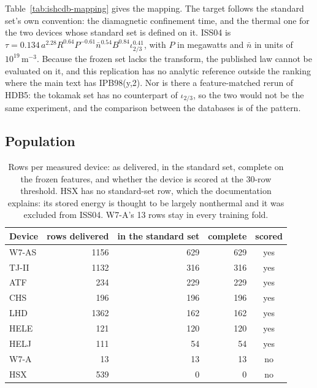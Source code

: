\documentclass[12pt,letterpaper]{article}
\newcommand{\iotatwothirds}{\iota_{2/3}}
\begin{document}
Table~\ref{tab:ishcdb-mapping} gives the mapping. The target follows the standard set's own convention: the diamagnetic
confinement time, and the thermal one for the two devices whose standard set is
defined on it. ISS04 is
$\tau = 0.134\, a^{2.28} R^{0.64}
P^{-0.61} \bar{n}^{0.54}
B^{0.84} \iotatwothirds^{0.41}$,
with $P$ in megawatts and $\bar{n}$ in units of $10^{19}\,\mathrm{m}^{-3}$.
Because the frozen set lacks the transform, the published law cannot be
evaluated on it, and this replication has no analytic reference outside the
ranking where the main text has IPB98(y,2). Nor is there a feature-matched rerun
of HDB5: the tokamak set has no counterpart of $\iotatwothirds$, so the two would
not be the same experiment, and the comparison between the databases is of the
pattern.

\subsection{Population}

\begin{table}[htbp]
\centering\small
\caption{Rows per measured device: as delivered, in the standard set, complete
on the frozen features, and whether the device is scored at the
30-row threshold. HSX has no standard-set row, which the
documentation explains: its stored energy is thought to be largely nonthermal
and it was excluded from ISS04. W7-A's 13 rows stay in
every training fold.}
\label{tab:ishcdb-population}
\begin{tabular}{lrrrc}
\toprule
Device & rows delivered & in the standard set & complete & scored \\
\midrule
W7-AS & 1156 & 629 & 629 & yes \\
TJ-II & 1132 & 316 & 316 & yes \\
ATF & 234 & 229 & 229 & yes \\
CHS & 196 & 196 & 196 & yes \\
LHD & 1362 & 162 & 162 & yes \\
HELE & 121 & 120 & 120 & yes \\
HELJ & 111 & 54 & 54 & yes \\
W7-A & 13 & 13 & 13 & no \\
HSX & 539 & 0 & 0 & no \\
\bottomrule
\end{tabular}
\par\smallskip{}
\end{table}
\end{document}

